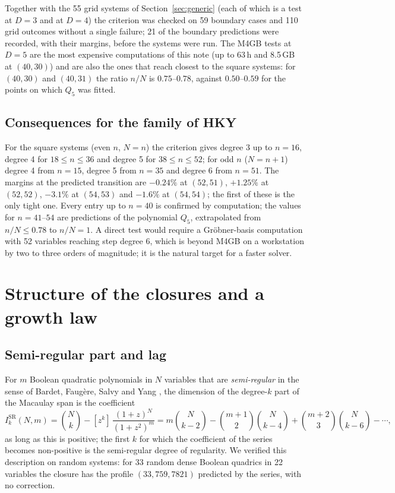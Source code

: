 \documentclass[11pt,a4paper]{article}
\theoremstyle{remark}\newtheorem{remark}{Remark}
\newcommand{\SR}{\mathrm{SR}}
\begin{document}
Together with the 55 grid systems of Section~\ref{sec:generic} (each of which is a test at $D=3$ and at $D=4$) the criterion was checked on 59 boundary cases and 110 grid outcomes without a single failure; 21 of the boundary predictions were recorded, with their margins, before the systems were run. The M4GB tests at $D=5$ are the most expensive computations of this note (up to 63\,h and 8.5\,GB at $(40,30)$) and are also the ones that reach closest to the square systems: for $(40,30)$ and $(40,31)$ the ratio $n/N$ is $0.75$--$0.78$, against $0.50$--$0.59$ for the points on which $Q_5$ was fitted.

\subsection{Consequences for the family of HKY}

For the square systems (even $n$, $N=n$) the criterion gives degree 3 up to $n=16$, degree 4 for $18\le n\le36$ and degree 5 for $38\le n\le52$; for odd $n$ ($N=n+1$) degree 4 from $n=15$, degree 5 from $n=35$ and degree 6 from $n=51$. The margins at the predicted transition are $-0.24\%$ at $(52,51)$, $+1.25\%$ at $(52,52)$, $-3.1\%$ at $(54,53)$ and $-1.6\%$ at $(54,54)$; the first of these is the only tight one. Every entry up to $n=40$ is confirmed by computation; the values for $n=41$--$54$ are predictions of the polynomial $Q_5$, extrapolated from $n/N\le0.78$ to $n/N=1$. A direct test would require a Gröbner-basis computation with 52 variables reaching step degree 6, which is beyond M4GB on a workstation by two to three orders of magnitude; it is the natural target for a faster solver.
\section{Structure of the closures and a growth law}\label{sec:structure}

\subsection{Semi-regular part and lag}

For $m$ Boolean quadratic polynomials in $N$ variables that are \emph{semi-regular} in the sense of Bardet, Faugère, Salvy and Yang \cite{BFS03,BFSY05}, the dimension of the degree-$k$ part of the Macaulay span is the coefficient
\[
I_k^{\SR}(N,m)=\binom Nk-[z^k]\,\frac{(1+z)^N}{(1+z^2)^m}
= m\binom N{k-2}-\binom{m+1}2\binom N{k-4}+\binom{m+2}3\binom N{k-6}-\cdots,
\]
as long as this is positive; the first $k$ for which the coefficient of the series becomes non-positive is the semi-regular degree of regularity. We verified this description on random systems: for 33 random dense Boolean quadrics in 22 variables the closure has the profile $(33,759,7821)$ predicted by the series, with no correction.
\end{document}
